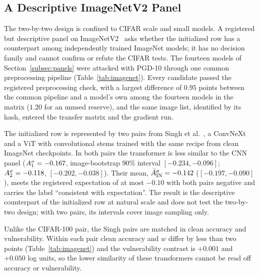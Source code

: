 \subsection{A Descriptive ImageNetV2 Panel}
\label{subsec:imagenet}

The two-by-two design is confined to CIFAR scale and small models. A registered but descriptive panel on ImageNetV2~\cite{recht2019imagenet} asks whether the initialized row has a counterpart among independently trained ImageNet models; it has no decision family and cannot confirm or refute the CIFAR tests. The fourteen models of Section~\ref{subsec:panels} were attacked with PGD-10 through one common preprocessing pipeline (Table~\ref{tab:imagenet}). Every candidate passed the registered preprocessing check, with a largest difference of $0.95$ points between the common pipeline and a model's own among the fourteen models in the matrix ($1.20$ for an unused reserve), and the same image list, identified by its hash, entered the transfer matrix and the gradient run.

The initialized row is represented by two pairs from Singh et al.~\cite{singh2023revisiting}, a ConvNeXt and a ViT with convolutional stems trained with the same recipe from clean ImageNet checkpoints. In both pairs the transformer is less similar to the CNN panel ($A^{\sigma}_{1} = -0.167$, image-bootstrap 90\% interval $[-0.234, -0.096]$; $A^{\sigma}_{2} = -0.118$, $[-0.202, -0.038]$). Their mean, $\bar{A}^{\sigma}_{\mathrm{IN}} = -0.142$ ($[-0.197, -0.090]$), meets the registered expectation of at most $-0.10$ with both pairs negative and carries the label ``consistent with expectation''. The result is the descriptive counterpart of the initialized row at natural scale and does not test the two-by-two design; with two pairs, its intervals cover image sampling only.

Unlike the CIFAR-100 pair, the Singh pairs are matched in clean accuracy and vulnerability. Within each pair clean accuracy and $w$ differ by less than two points (Table~\ref{tab:imagenet}) and the vulnerability contrast is $+0.001$ and $+0.050$ log units, so the lower similarity of these transformers cannot be read off accuracy or vulnerability.

